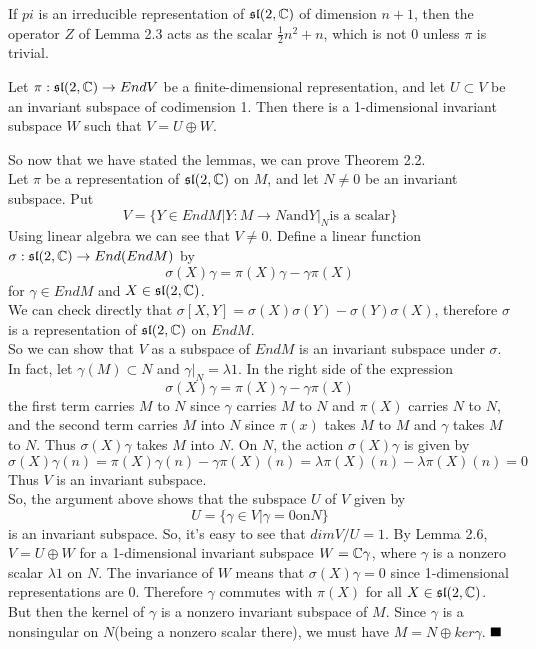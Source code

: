 \documentclass{article}
\begin{document}
\begin{lemma}
If $pi$ is an irreducible representation of $\mathfrak{sl}(2,\mathbb{C})$ of dimension $n+1$, then the operator $Z$ of Lemma 2.3 acts as the scalar $\frac{1}{2}n^2+n$, which is not $0$ unless $\pi$ is trivial. 
\end{lemma}

\begin{lemma}
Let $\pi:\mathfrak{sl}(2,\mathbb{C})\rightarrow EndV$ be a finite-dimensional representation, and let $U\subset V$ be an invariant subspace of codimension 1. Then there is a 1-dimensional invariant subspace $W$ such that $V=U\oplus W$. 
\end{lemma}
So now that we have stated the lemmas, we can prove Theorem 2.2.\\
Let $\pi$ be a representation of $\mathfrak{sl}(2,\mathbb{C})$ on $M$, and let $N\neq 0$ be an invariant subspace. Put
$$V=\{Y\in EndM|Y:M\rightarrow N \text{and} Y|_{N} \text{is a scalar}\} $$
Using linear algebra we can see that $V\neq 0$. Define a linear function $\sigma:\mathfrak{sl}(2,\mathbb{C})\rightarrow End(EndM)$ by 
$$\sigma(X)\gamma = \pi(X)\gamma -\gamma\pi(X) $$
for $\gamma\in EndM$ and $X\in \mathfrak{sl}(2,\mathbb{C})$.\\
We can check directly that $\sigma[X,Y]=\sigma(X)\sigma(Y)-\sigma(Y)\sigma(X)$, therefore $\sigma$ is a representation of $\mathfrak{sl}(2,\mathbb{C})$ on $EndM$.\\
So we can show that $V$ as a subspace of $EndM$ is an invariant subspace under $\sigma$. In fact, let $\gamma(M)\subset N$ and $\gamma|_N=\lambda1$. In the right side of the expression 
$$\sigma(X)\gamma = \pi(X)\gamma-\gamma\pi(X)$$
the first term carries $M$ to $N$ since $\gamma$ carries $M$ to $N$ and $\pi(X)$ carries $N$ to $N$, and the second term carries $M$ into $N$ since $\pi(x)$ takes $M$ to $M$ and $\gamma$ takes $M$ to $N$. Thus $\sigma(X)\gamma$ takes $M$ into $N$. On $N$, the action $\sigma(X)\gamma$ is given by 
$$\sigma(X)\gamma(n)=\pi(X)\gamma(n)-\gamma\pi(X)(n)=\lambda\pi(X)(n)-\lambda\pi(X)(n) = 0 $$
Thus $V$ is an invariant subspace. \\
So, the argument above shows that the subspace $U$ of $V$ given by 
$$U=\{\gamma\in V|\gamma=0 \text{on} N\} $$
is an invariant subspace. So, it's easy to see that $dimV/U=1$. By Lemma 2.6, $V=U\oplus W$ for a 1-dimensional invariant subspace $W=\mathbb{C}\gamma$, where $\gamma$ is a nonzero scalar $\lambda1$ on $N$. The invariance of $W$ means that $\sigma(X)\gamma=0$ since 1-dimensional representations are $0$. Therefore $\gamma$ commutes with $\pi(X)$ for all $X\in  \mathfrak{sl}(2,\mathbb{C})$. But then the kernel of $\gamma$ is a nonzero invariant subspace of $M$. Since $\gamma$ is a nonsingular on $N$(being a nonzero scalar there), we must have $M=N\oplus ker\gamma$. 
$\qed$
\end{document}
